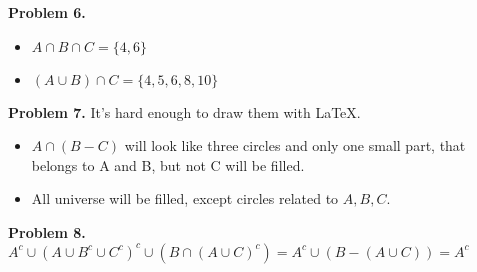 \documentclass[a4paper,12pt]{article}
\newenvironment{problem}[1]{\par\bigskip\noindent\textbf{Problem #1.} \newline}{}
\begin{document}
  \begin{problem}{6}
    \begin{itemize}
    \item $A \cap B \cap C = \{4, 6\}$
    \item $(A \cup B) \cap C = \{4, 5, 6, 8, 10\}$
    \end{itemize}
  \end{problem}

  \begin{problem}{7}
    It's hard enough to draw them with LaTeX.
    \begin{itemize}
    \item $A \cap (B - C)$ will look like three circles and only one small
      part, that belongs to A and B, but not C will be filled.
    \item All universe will be filled, except circles related to $A, B, C$.
    \end{itemize}
  \end{problem}


  \begin{problem}{8}
    $A^c \cup (A \cup B^c \cup C^c)^c \cup (B \cap (A \cup C)^c)
    = A^c \cup (B - (A \cup C)) = A^c$
  \end{problem}
\end{document}
